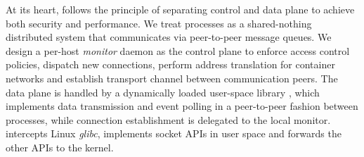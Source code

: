 






At its heart, \sys{} follows the principle of separating control and data plane to achieve both security and performance.
We treat processes as a shared-nothing distributed system that communicates via peer-to-peer message queues.
We design a per-host \emph{monitor} daemon as the control plane to enforce access control policies, dispatch new connections, perform address translation for container networks and establish transport channel between communication peers.
The data plane is handled by a dynamically loaded user-space library \libipc{}, which implements data transmission and event polling in a peer-to-peer fashion between processes, while connection establishment is delegated to the local monitor.
\libipc{} intercepts Linux \emph{glibc}, implements socket APIs in user space and forwards the other APIs to the kernel.

